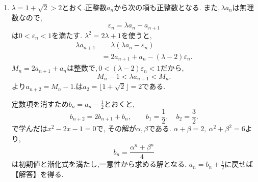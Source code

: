 \noindent {}\par\nobreak
\begin{enumerate}[label=(\arabic*),parsep=3pt,beginpenalty=10000,format=\bookitemlink{example-gauss-role-5}{solution}{problem}]
  \item $\lambda=1+\sqrt2>2$とおく.正整数$a_n$から次の項も正整数となる.
    また,\,$\lambda a_n$は無理数なので,
    \[
      \varepsilon_n=\lambda a_n-a_{n+1}
    \]
    は$0<\varepsilon_n<1$を満たす.
    $\lambda^2=2\lambda+1$を使うと,
    \begin{align*}
      \lambda a_{n+1}
      &=\lambda(\lambda a_n-\varepsilon_n)\\
      &=2a_{n+1}+a_n-(\lambda-2)\varepsilon_n.
    \end{align*}
    $M_n=2a_{n+1}+a_n$は整数で,\,$0<(\lambda-2)\varepsilon_n<1$だから,
    \[
      M_n-1<\lambda a_{n+1}<M_n.
    \]
    より$a_{n+2}=M_n-1$.は$a_2=\lfloor1+\sqrt2\rfloor=2$である.

    定数項を消すため$b_n=a_n-\frac12$とおくと,
    \[
      b_{n+2}=2b_{n+1}+b_n,
      \qquad b_1=\frac12,\quad b_2=\frac32.
    \]
    で学んだは$x^2-2x-1=0$で,
    その解が$\alpha,\beta$である.
    $\alpha+\beta=2,\ \alpha^2+\beta^2=6$より,
    \[
      b_n=\frac{\alpha^n+\beta^n}{4}
    \]
    は初期値と漸化式を満たし,一意性から求める解となる.
    $a_n=b_n+\frac12$に戻せば【解答】を得る.
\end{enumerate}

